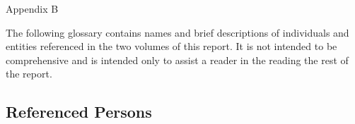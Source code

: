 
\thispagestyle{empty}

\vspace*{15em}

\begin{center}

\Huge
Appendix B

\end{center}

\cleardoublepage

The following glossary contains names and brief descriptions of individuals and entities referenced in the two volumes of this report.
It is not intended to be comprehensive and is intended only to assist a reader in the reading the rest of the report.

\subsection{Referenced Persons}

